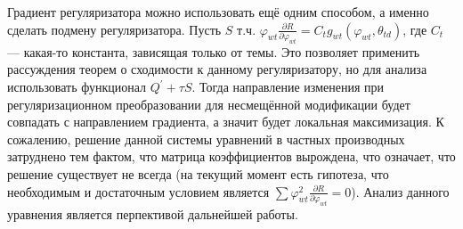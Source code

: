 \documentclass[12pt]{article}
\renewcommand{\phi}{\varphi}
\begin{document}
Градиент регуляризатора можно использовать ещё одним способом, а именно сделать подмену регуляризатора. Пусть $S$ т.ч. $\phi_{wt}\frac{\partial{R}}{\partial{\phi_{wt}}} = C_t g_{wt}(\phi_{wt}, \theta_{td})$, где $C_t$ --- какая-то константа, зависящая только от темы. Это позволяет применить рассуждения теорем о сходимости к данному регуляризатору, но для анализа использовать функционал $Q^{\prime} + \tau S$. Тогда направление изменения при регуляризационном преобразовании для несмещённой модификации будет совпадать с направлением градиента, а значит будет локальная максимизация. К сожалению, решение данной системы уравнений в частных производных затруднено тем фактом, что матрица коэффициентов вырождена, что означает, что решение существует не всегда (на текущий момент есть гипотеза, что необходимым и достаточным условием является $\sum \phi_{wt}^2 \frac{\partial{R}}{\partial{\phi_{wt}}} = 0$). Анализ данного уравнения является перпективой дальнейшей работы.
\end{document}
